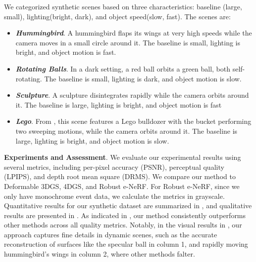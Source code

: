 We categorized synthetic scenes based on three characteristics:
baseline (large, small), lighting(bright, dark), and object speed(slow, fast). 
The scenes are:



\begin{itemize}
    \item \textit{\textbf{Hummingbird}}. 
    A hummingbird flaps its wings at very high speeds while the camera moves in a small circle around it. The baseline is small, lighting is bright, and object motion is fast.
    \item \textit{\textbf{Rotating Balls}}. In a dark setting, a red ball orbits a green ball, both self-rotating.
    The baseline is small, lighting is dark, and object motion is slow.
    \item \textit{\textbf{Sculpture}}. A sculpture disintegrates rapidly while the camera orbits around it.
    The baseline is large, lighting is bright, and object motion is fast
    \item \textit{\textbf{Lego}}. From \citet{ma2023deformable}, this scene features a Lego bulldozer with the bucket performing two sweeping motions, while the camera orbits around it.
    The baseline is large, lighting is bright, and object motion is slow.
\end{itemize}






\vspace{1mm}
\noindent
\textbf{Experiments and Assessment}.
We evaluate our experimental results using several metrics, including per-pixel accuracy (PSNR), perceptual quality (LPIPS)\cite{zhang2018unreasonable}, and depth root mean square (DRMS).
We compare our method to Deformable 3DGS\cite{yang2024deformable}, 4DGS\cite{wu20244d}, and Robust e-NeRF\cite{low2023robust}. For Robust e-NeRF\cite{low2023robust}, since we only have monochrome event data, we calculate the metrics in grayscale.
Quantitative results for our synthetic dataset are summarized in \tableautorefname{~\ref{tab:synthesis_data}}, and qualitative results are presented in \figureautorefname{~\ref{fig:general-results}}. As indicated in \tableautorefname{~\ref{tab:synthesis_data}}, our method consistently outperforms other methods across all quality metrics. Notably, in the visual results in \figureautorefname{~\ref{fig:general-results}}, our approach captures fine details in dynamic scenes, such as the accurate reconstruction of surfaces like the specular ball in column 1, and rapidly moving hummingbird's wings in column 2, where other methods falter.

